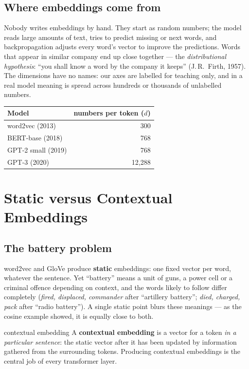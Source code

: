 \documentclass[11pt]{article}
\begin{document}
\subsection{Where embeddings come from}
Nobody writes embeddings by hand. They start as random numbers; the model reads large amounts of text, tries to predict missing or next words, and backpropagation adjusts every word's vector to improve the predictions. Words that appear in similar company end up close together --- the \emph{distributional hypothesis}: ``you shall know a word by the company it keeps'' (J.\,R.\ Firth, 1957). The dimensions have no names: our axes are labelled for teaching only, and in a real model meaning is spread across hundreds or thousands of unlabelled numbers.
\begin{center}\small\renewcommand{\arraystretch}{1.25}
\begin{tabular}{lr}\toprule
\textbf{Model} & \textbf{numbers per token ($d$)}\\\midrule
word2vec (2013) & 300\\
BERT-base (2018) & 768\\
GPT-2 small (2019) & 768\\
GPT-3 (2020) & 12,288\\\bottomrule
\end{tabular}\end{center}

\section{Static versus Contextual Embeddings}
\subsection{The battery problem}
word2vec and GloVe produce \textbf{static} embeddings: one fixed vector per word, whatever the sentence. Yet ``battery'' means a unit of guns, a power cell or a criminal offence depending on context, and the words likely to follow differ completely (\emph{fired, displaced, commander} after ``artillery battery''; \emph{died, charged, pack} after ``radio battery''). A single static point blurs these meanings --- as the cosine example showed, it is equally close to both.
\begin{definition}{contextual embedding}
A \textbf{contextual embedding} is a vector for a token \emph{in a particular sentence}: the static vector after it has been updated by information gathered from the surrounding tokens. Producing contextual embeddings is the central job of every transformer layer.
\end{definition}
\end{document}
